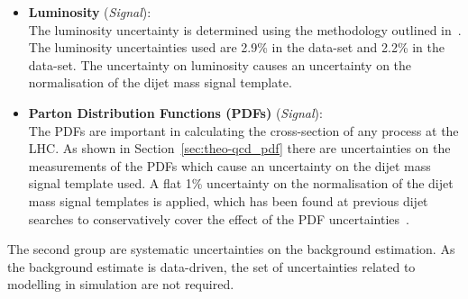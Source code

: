 \begin{itemize}[leftmargin=*]
  The uncertainty on the $b$-jet trigger scale factors cause an uncertainty on the normalisation of each point in the dijet mass signal template.
  This systematic uncertainty is only used in the \lm{} data-set, as this is the only data-set using a $b$-jet trigger.
  \vspace{0.5em}
  \newpage
\item\textbf{Luminosity} \hspace{1mm} (\textit{Signal}):\\
  The luminosity uncertainty is determined using the methodology outlined in~\cite{lim-syst_lumi}.
  The luminosity uncertainties used are 2.9\% in the \summer{} data-set and 2.2\% in the \lm{} data-set.
  The uncertainty on luminosity causes an uncertainty on the normalisation of the dijet mass signal template.
  \vspace{0.5em}
\item\textbf{Parton Distribution Functions (PDFs) } \hspace{1mm}  (\textit{Signal}):\\
  The PDFs are important in calculating the cross-section of any process at the LHC.
  As shown in Section~\ref{sec:theo-qcd_pdf} there are uncertainties on the measurements of the PDFs
  which cause an uncertainty on the dijet mass signal template used.
  A flat 1\% uncertainty on the normalisation of the dijet mass signal templates is applied,
  which has been found at previous dijet searches to conservatively cover
  the effect of the PDF uncertainties~\cite{dijet-mori16_paper}.
  \vspace{0.5em}
\end{itemize}

The second group are systematic uncertainties on the background estimation.
As the background estimate is data-driven, the set of uncertainties related to modelling in simulation are not required.

